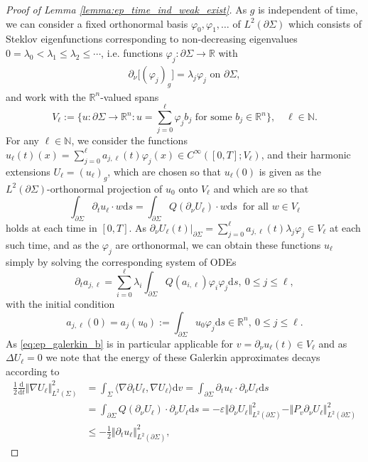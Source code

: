 \documentclass[10pt,a4paper]{amsart}
\newcommand{\De}{\Delta}
\newcommand{\N}{\ensuremath{{\mathbb N}}}
\newcommand{\R}{\ensuremath{{\mathbb R}}}
\newcommand{\Si}{\Sigma}
\newcommand{\beq}{\begin{equation}}
\newcommand{\beqs}{\begin{equation*}}
\newcommand{\dd}{\mathrm{d}} %
\newcommand{\eeq}{\end{equation}}
\newcommand{\eeqs}{\end{equation*}}
\newcommand{\ep}{\varepsilon}
\newcommand{\half}{\frac{1}{2}}
\newcommand{\hf}{\frac{1}{2}} %
\newcommand{\inner}[2]{\langle #1, #2\rangle} %
\newcommand{\la}{\lambda} %
\newcommand{\norm}[1]{\Vert#1\Vert}
\newcommand{\p}{\partial} %
\newcommand{\pSi}{{\partial \Sigma}}
\newcommand{\vph}{\varphi}
\begin{document}
\begin{proof}[Proof of Lemma \ref{lemma:ep_time_ind_weak_exist}]
    As $g$ is independent of time, we can consider a fixed orthonormal basis $\vph_0,\vph_1,\ldots$ of $L^2(\pSi)$ which consists of Steklov eigenfunctions corresponding to non-decreasing eigenvalues $0 = \la_0 < \la_1 \leq \la_2 \leq \cdots $, i.e. functions $\vph_j:\pSi\to \R$ with
    \begin{align*}
    	\p_{\nu}\big[ (\vph_j)_g\big] = \la_j \vph_j \text{ on }\p\Si,
    \end{align*}
    and work with the $\R^n$-valued spans
    \beqs
        V_\ell := \big\{u:\pSi\to \R^n: u=\sum_{j=0}^\ell\varphi_j b_j \text{ for some } b_j\in\R^n\big\},\quad \ell \in \N.
    \eeqs
    For any $\ell\in\N$, we consider the functions $u_\ell(t)(x)= \sum_{j=0}^\ell a_{j,\ell}(t)\vph_j(x) \in C^\infty([0,T];V_\ell)$, and their harmonic extensions $U_\ell=(u_\ell)_g$, which are chosen so that  $u_\ell(0)$ is given as the $L^2(\pSi)$-orthonormal projection of $u_0$ onto $V_\ell$ and which are so that
    \beq\label{eq:ep_galerkin_b}
        \int_{\p\Si}\p_t u_\ell\cdot w\dd s = \int_{\p\Si}Q(\p_{\nu} U_\ell) \cdot w\dd s\ \text{ for all }w\in V_\ell
    \eeq
    holds at each time in $[0,T]$. As $\p_{\nu}U_\ell(t)\vert_{\pSi} = \sum_{j=0}^\ell a_{j,\ell}(t)\la_j \vph_j \in V_\ell$ at each such time, and as the $\vph_j$ are orthonormal, we can obtain these functions $u_\ell$ simply by solving the corresponding system of ODEs %
    \beqs
        \p_ta_{j,\ell} = \sum_{i=0}^\ell \la_i\int_{\p\Si}Q(a_{i,\ell})\vph_i\vph_j\dd s,\ 0\le j\le\ell,
    \eeqs
    with the initial condition
    \beqs
        a_{j,\ell}(0) =a_j(u_0):= \int_{\p\Si}u_0\vph_j \dd s\in \R^n,\ 0\le j\le\ell.
    \eeqs
    As \eqref{eq:ep_galerkin_b} is in particular applicable for $v=\p_\nu u_\ell(t)\in V_\ell$ and as $\De U_\ell=0$ we note that the energy of these Galerkin approximates decays according to     
    \begin{align}\label{est:galerkin_uniform_bound}
        \hf\frac{\dd}{\dd t}\norm{\nabla U_\ell}_{L^2(\Si)}^2 &= \int_\Si\inner{\nabla\p_t U_\ell}{\nabla U_\ell}\dd v = \int_{\p\Si}\p_tu_\ell\cdot\p_{\nu}U_\ell\dd s\nonumber\\
        & = \int_{\p\Si}Q(\p_{\nu}U_\ell)\cdot\p_{\nu}U_\ell\dd s = -\ep\norm{\p_{\nu}U_\ell}_{L^2(\p\Si)}^2-\norm{P_{v}\p_{\nu}U_\ell}_{L^2(\p\Si)}^2\\
        & \le -\half\norm{\p_t u_\ell}_{L^2(\p\Si)}^2,\nonumber

\end{align}
\end{proof}
\end{document}
